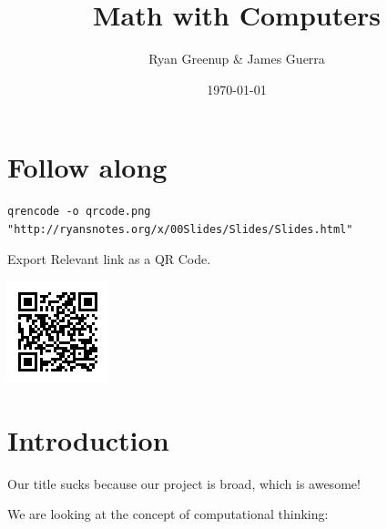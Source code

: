 \documentclass[11pt]{article}
\author{Ryan Greenup \& James Guerra}
\date{\today}
\title{Math with Computers}
\begin{document}
\maketitle
\tableofcontents


\section{Follow along}
\label{sec:org349ac8a}

\begin{listing}[htbp]
\begin{verbatim}
qrencode -o qrcode.png "http://ryansnotes.org/x/00Slides/Slides/Slides.html"
\end{verbatim}
\caption{\label{qcode}Export Relevant link as a QR Code.}
\end{listing}

\begin{center}
\includegraphics[width=.9\linewidth]{qrcode.png}
\end{center}


\section{Introduction}
\label{sec:org26d9228}

Our title sucks because our project is broad, which is awesome!

We are looking at the concept of computational thinking:
\end{document}

